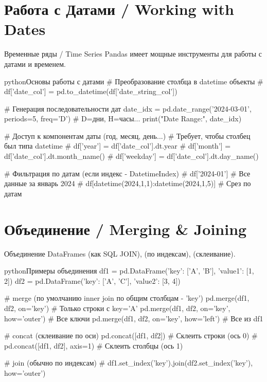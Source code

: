 \section{Работа с Датами / Working with Dates}
\begin{textbox}{Временные ряды / Time Series}
Pandas имеет мощные инструменты для работы с датами и временем.

\begin{codebox}{python}{Основы работы с датами}
# Преобразование столбца в datetime объекты
# df['date_col'] = pd.to_datetime(df['date_string_col'])

# Генерация последовательности дат
date_idx = pd.date_range('2024-03-01', periods=5, freq='D') # D=дни, H=часы...
print("Date Range:\n", date_idx)

# Доступ к компонентам даты (год, месяц, день...)
# Требует, чтобы столбец был типа datetime
# df['year'] = df['date_col'].dt.year
# df['month'] = df['date_col'].dt.month_name()
# df['weekday'] = df['date_col'].dt.day_name()

# Фильтрация по датам (если индекс - DatetimeIndex)
# df['2024-01'] # Все данные за январь 2024
# df[datetime(2024,1,1):datetime(2024,1,5)] # Срез по датам
\end{codebox}
\end{textbox}

\section{Объединение / Merging \& Joining}
\begin{textbox}{Объединение DataFrames}
 (как SQL JOIN),  (по индексам),  (склеивание).

\begin{codebox}{python}{Примеры объединения}
df1 = pd.DataFrame({'key': ['A', 'B'], 'value1': [1, 2]})
df2 = pd.DataFrame({'key': ['A', 'C'], 'value2': [3, 4]})

# merge (по умолчанию inner join по общим столбцам - 'key')
pd.merge(df1, df2, on='key') # Только строки с key='A'
pd.merge(df1, df2, on='key', how='outer') # Все ключи
pd.merge(df1, df2, on='key', how='left') # Все из df1

# concat (склеивание по оси)
pd.concat([df1, df2]) # Склеить строки (ось 0)
# pd.concat([df1, df2], axis=1) # Склеить столбцы (ось 1)

# join (обычно по индексам)
# df1.set_index('key').join(df2.set_index('key'), how='outer')
\end{codebox}
\end{textbox}

